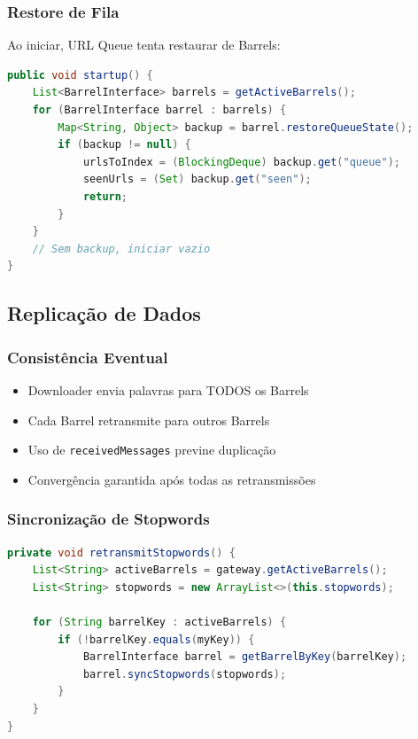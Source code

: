 \documentclass[12pt,a4paper]{article}
\begin{document}
\subsubsection{Restore de Fila}
Ao iniciar, URL Queue tenta restaurar de Barrels:
\begin{lstlisting}[language=Java, caption={Restore de backup}]
public void startup() {
    List<BarrelInterface> barrels = getActiveBarrels();
    for (BarrelInterface barrel : barrels) {
        Map<String, Object> backup = barrel.restoreQueueState();
        if (backup != null) {
            urlsToIndex = (BlockingDeque) backup.get("queue");
            seenUrls = (Set) backup.get("seen");
            return;
        }
    }
    // Sem backup, iniciar vazio
}
\end{lstlisting}

\subsection{Replicação de Dados}

\subsubsection{Consistência Eventual}
\begin{itemize}
    \item Downloader envia palavras para TODOS os Barrels
    \item Cada Barrel retransmite para outros Barrels
    \item Uso de \texttt{receivedMessages} previne duplicação
    \item Convergência garantida após todas as retransmissões
\end{itemize}

\subsubsection{Sincronização de Stopwords}
\begin{lstlisting}[language=Java, caption={Sincronização de stopwords}]
private void retransmitStopwords() {
    List<String> activeBarrels = gateway.getActiveBarrels();
    List<String> stopwords = new ArrayList<>(this.stopwords);
    
    for (String barrelKey : activeBarrels) {
        if (!barrelKey.equals(myKey)) {
            BarrelInterface barrel = getBarrelByKey(barrelKey);
            barrel.syncStopwords(stopwords);
        }
    }
}
\end{lstlisting}
\end{document}
